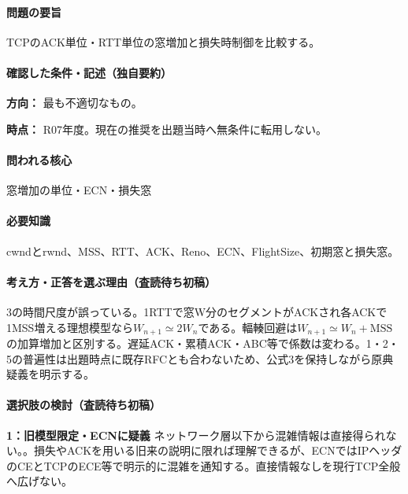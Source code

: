 \paragraph{問題の要旨} TCPのACK単位・RTT単位の窓増加と損失時制御を比較する。

\paragraph{確認した条件・記述（独自要約）}\mbox{}\par

\noindent\textbf{方向：} 最も不適切なもの。\par

\noindent\textbf{時点：} R07年度。現在の推奨を出題当時へ無条件に転用しない。\par

\paragraph{問われる核心} 窓増加の単位・ECN・損失窓

\paragraph{必要知識} cwndとrwnd、MSS、RTT、ACK、Reno、ECN、FlightSize、初期窓と損失窓。

\paragraph{考え方・正答を選ぶ理由（査読待ち初稿）} 3の時間尺度が誤っている。1RTTで窓W分のセグメントがACKされ各ACKで1MSS増える理想模型なら\(W_{n+1}\simeq2W_n\)である。輻輳回避は\(W_{n+1}\simeq W_n+\mathrm{MSS}\)の加算増加と区別する。遅延ACK・累積ACK・ABC等で係数は変わる。1・2・5の普遍性は出題時点に既存RFCとも合わないため、公式3を保持しながら原典疑義を明示する。

\paragraph{選択肢の検討（査読待ち初稿）}\mbox{}\par

\noindent\textbf{1：旧模型限定・ECNに疑義} ネットワーク層以下から混雑情報は直接得られない。。損失やACKを用いる旧来の説明に限れば理解できるが、ECNではIPヘッダのCEとTCPのECE等で明示的に混雑を通知する。直接情報なしを現行TCP全般へ広げない。\par

